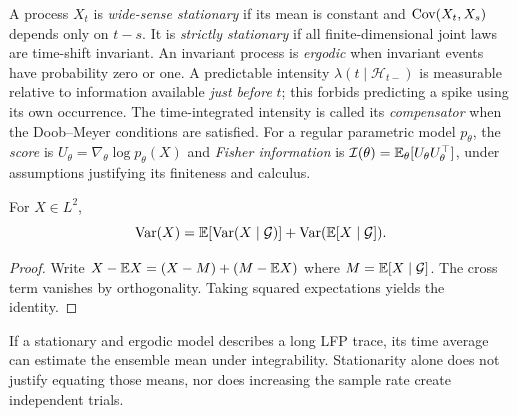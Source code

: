 \begin{definition}
A process $X_t$ is \emph{wide-sense stationary} if its mean is
constant and $\operatorname{Cov}(X_t,X_s)$ depends only on $t-s$.
It is \emph{strictly stationary} if all finite-dimensional
joint laws are time-shift invariant. An invariant process is
\emph{ergodic} when invariant events have probability zero or one.
A predictable intensity $\lambda(t\mid\mathcal H_{t-})$ is
measurable relative to information available \emph{just before}
$t$; this forbids predicting a spike using its own occurrence.
The time-integrated intensity is called its \emph{compensator}
when the Doob--Meyer conditions are satisfied.
For a regular parametric model $p_\theta$, the \emph{score} is
$U_\theta=\nabla_\theta\log p_\theta(X)$ and
\emph{Fisher information} is
$\mathcal I(\theta)=\mathbb{E}_\theta[U_\theta U_\theta^\top]$,
under assumptions justifying its finiteness and calculus.
\end{definition}
\begin{proposition}
For $X\in L^2$,
\[
\operatorname{Var}(X)=\mathbb{E}[\operatorname{Var}(X\mid\mathcal G)]
 +\operatorname{Var}(\mathbb{E}[X\mid\mathcal G]).
\]
\end{proposition}
\begin{proof}
Write $X-\mathbb{E} X=(X-M)+(M-\mathbb{E} X)$ where
$M=\mathbb{E}[X\mid\mathcal G]$. The cross term vanishes by
orthogonality. Taking squared expectations yields the identity.
\end{proof}
\begin{example}
If a stationary and ergodic model describes a long LFP trace,
its time average can estimate the ensemble mean under integrability.
Stationarity alone does not justify equating those means, nor does
increasing the sample rate create independent trials.
\end{example}
